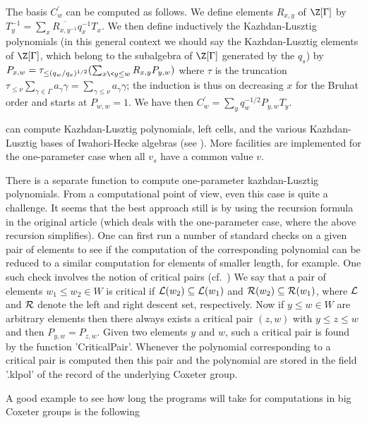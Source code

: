 The  basis  $C^\prime_w$  can  be  computed  as follows. We define elements
$R_{x,y}$   of  $\Z[\Gamma]$  by  $T_y^{-1}=\sum_x  \overline{R_{x,y^{-1}}}
q_x^{-1}T_x$.  We then  define inductively  the Kazhdan-Lusztig polynomials
(in  this general  context we  should say  the Kazhdan-Lusztig  elements of
$\Z[\Gamma]$,  which belong to the  subalgebra of $\Z[\Gamma]$ generated by
the    $q_s$)    by    $P_{x,w}=\tau_{\le(q_w/q_x)^{1/2}}    (\sum_{x\<y\le
w}R_{x,y}P_{y,w})$  where  $\tau$  is  the  truncation  \:\  $\tau_{\le\nu}
\sum_{\gamma\in\Gamma}  a_\gamma\gamma= \sum_{\gamma\le\nu}a_\gamma\gamma$;
the induction is thus on decreasing $x$ for the Bruhat order and starts at
$P_{w,w}=1$. We have then $C^\prime_w=\sum_y q_w^{-1/2} P_{y,w}T_y$.

{\CHEVIE}  can  compute  Kazhdan-Lusztig  polynomials,  left cells, and the
various  Kazhdan-Lusztig bases of Iwahori-Hecke algebras (see \cite{KL79}).
More  facilities are implemented for the  one-parameter case when all $v_s$
have a common value $v$.

There  is  a  separate  function  to  compute one-parameter kazhdan-Lusztig
polynomials.  From a computational point of view, even this case is quite a
challenge.  It seems that the best approach still is by using the recursion
formula   in  the  original  article  \cite{KL79}  (which  deals  with  the
one-parameter  case, where the  above recursion simplifies).  One can first
run  a number of standard checks on a  given pair of elements to see if the
computation  of the  corresponding polynomial  can be  reduced to a similar
computation  for elements  of smaller  length, for  example. One such check
involves  the notion of critical pairs  (cf.\ \cite{Alv87})\: We say that a
pair of elements $w_1\le w_2 \in W$ is critical if ${\cal L}(w_2) \subseteq
{\cal  L}(w_1)$ and ${\cal  R}(w_2) \subseteq {\cal  R}(w_1)$, where ${\cal
L}$ and ${\cal R}$ denote the left and right descent set, respectively. Now
if  $y\le  w  \in  W$  are  arbitrary  elements  then there always exists a
critical  pair $(z,w)$ with $y\le z\le w$ and then $P_{y,w}=P_{z,w}$. Given
two  elements $y$ and  $w$, such a  critical pair is  found by the function
'CriticalPair'. Whenever the polynomial corresponding to a critical pair is
computed then this pair and the polynomial are stored in the field '.klpol'
of the record of the underlying Coxeter group.

A  good example to see how long  the programs will take for computations in
big Coxeter groups is the following\:

